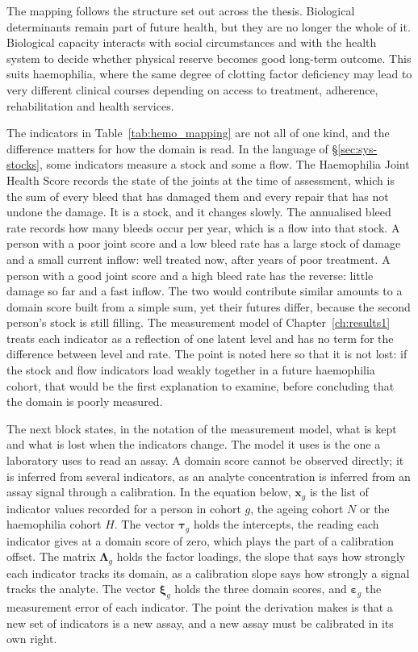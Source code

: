 The mapping follows the structure set out across the thesis. Biological determinants remain part of future health, but they are no longer the whole of it. Biological capacity interacts with social circumstances and with the health system to decide whether physical reserve becomes good long-term outcome. This suits haemophilia, where the same degree of clotting factor deficiency may lead to very different clinical courses depending on access to treatment, adherence, rehabilitation and health services.

The indicators in Table~\ref{tab:hemo_mapping} are not all of one kind, and the difference matters for how the domain is read. In the language of \S\ref{sec:sys-stocks}, some indicators measure a stock and some a flow. The Haemophilia Joint Health Score records the state of the joints at the time of assessment, which is the sum of every bleed that has damaged them and every repair that has not undone the damage. It is a stock, and it changes slowly. The annualised bleed rate records how many bleeds occur per year, which is a flow into that stock. A person with a poor joint score and a low bleed rate has a large stock of damage and a small current inflow: well treated now, after years of poor treatment. A person with a good joint score and a high bleed rate has the reverse: little damage so far and a fast inflow. The two would contribute similar amounts to a domain score built from a simple sum, yet their futures differ, because the second person's stock is still filling. The measurement model of Chapter~\ref{ch:results1} treats each indicator as a reflection of one latent level and has no term for the difference between level and rate. The point is noted here so that it is not lost: if the stock and flow indicators load weakly together in a future haemophilia cohort, that would be the first explanation to examine, before concluding that the domain is poorly measured.

The next block states, in the notation of the measurement model, what is kept and what is lost when the indicators change. The model it uses is the one a laboratory uses to read an assay. A domain score cannot be observed directly; it is inferred from several indicators, as an analyte concentration is inferred from an assay signal through a calibration. In the equation below, $\mathbf x_g$ is the list of indicator values recorded for a person in cohort $g$, the ageing cohort $N$ or the haemophilia cohort $H$. The vector $\boldsymbol\tau_g$ holds the intercepts, the reading each indicator gives at a domain score of zero, which plays the part of a calibration offset. The matrix $\boldsymbol\Lambda_g$ holds the factor loadings, the slope that says how strongly each indicator tracks its domain, as a calibration slope says how strongly a signal tracks the analyte. The vector $\boldsymbol\xi_g$ holds the three domain scores, and $\boldsymbol\varepsilon_g$ the measurement error of each indicator. The point the derivation makes is that a new set of indicators is a new assay, and a new assay must be calibrated in its own right.

